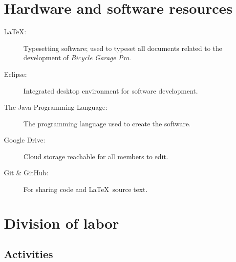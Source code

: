 \documentclass[12pt,titlepage]{article}
\begin{document}

\section{Hardware and software resources}
\label{sec:hardware-and-software-resources}

\begin{description}
	\item[\LaTeX:] Typesetting software; used to typeset all documents
		related to the development of \textit{Bicycle Garage Pro}.
	\item[Eclipse:] Integrated desktop environment for software development.
	\item[The Java Programming Language:] The programming language used to
		create the software.
	\item[Google Drive:] Cloud storage reachable for all members to edit.
	\item[Git \& GitHub:] For sharing code and \LaTeX~source text.
\end{description}



\section{Division of labor}

\subsection{Activities}
\end{document}
